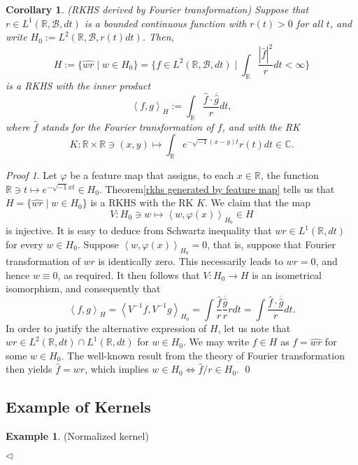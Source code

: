 \documentclass[a4paper,12pt]{article}
\newtheorem{cor}[thm]{Corollary}
\theoremstyle{remark}
\newtheorem*{prf}{Proof}
\theoremstyle{definition}
\theoremstyle{definition}
\newtheorem{ex}[thm]{Example}
\theoremstyle{definition}
\newcommand{\ip}[2]{\left<#1, #2 \right>}
\newcommand{\fin}{\hfill \( \triangleleft \) }
\begin{document}
\begin{cor}(RKHS derived by Fourier transformation)
	Suppose that \( r \in L^1(\mathbb{R}, \mathscr{B}, dt) \) is a bounded continuous function with \( r(t) >0 \) for all \( t \), and write
	\( H_0 := L^2(\mathbb{R}, \mathscr{B}, r(t)dt) \).
	Then,
	\[
		H:= \{ \hat{wr} \mid w \in H_0\}
		= \{ f \in L^2(\mathbb{R}, \mathscr{B}, dt) \mid \int_{\mathbb{R}} \frac{|\hat{f}|^2}{r}   dt < \infty \}
	\]
	is a RKHS with the inner product
	\[
		\ip{f}{g}_H := \int_{\mathbb{R}} \frac{\hat{f} \cdot \overline{\hat{g}}}{r} dt,
	\]
	where \( \hat{f} \) stands for the Fourier transformation of \( f \), and with the RK
	\[
		K: \mathbb{R} \times \mathbb{R} \ni (x,y) \mapsto \int_{\mathbb{R}} e^{-\sqrt{-1}(x-y)t} r(t) dt \in \mathbb{C}.
	\]
\end{cor}
\begin{prf}
	Let \( \varphi \) be a feature map that assigns, to each \( x \in \mathbb{R} \), the function \( \mathbb{R} \ni t \mapsto e^{- \sqrt{-1}xt} \in H_0 \). Theorem\ref{rkhs generated by feature map} tells us that \( H = \{\widehat{wr} \mid w \in H_0\} \) is a RKHS with the RK \( K \). We claim that the map
	\[
		V: H_0 \ni w \mapsto \ip{w}{\varphi(x)}_{H_0} \in H
	\]
	is injective. It is easy to deduce from Schwartz inequality that \( wr \in L^1(\mathbb{R}, dt) \) for every \( w \in H_0 \). Suppose \( \ip{w}{\varphi(x)}_{H_0} = 0 \), that is, suppose that Fourier transformation of \( wr \) is identically zero. This necessarily leads to \( wr = 0 \), and hence \(  w \equiv 0 \), as required.
	It then follows that \( V:H_0 \to H \) is an isometrical isomorphism, and consequently that
	\[
		\ip{f}{g}_H
		= \ip{V^{-1}f}{V^{-1}g}_{H_0}
		= \int \frac{\hat{f}}{r} \frac{\overline{\hat{g}}}{r} r dt
		= \int \frac{\hat{f} \cdot \overline{\hat{g}}}{r} dt.
	\]
	In order to justify the alternative expression of \( H \), let us note that \( wr \in L^2(\mathbb{R}, dt)\cap L^1(\mathbb{R}, dt) \) for \( w \in H_0 \).
	We may write \( f \in H \) as \( f = \widehat{wr} \) for some \( w \in H_0 \).
	The well-known result from the theory of Fourier transformation then yields \( \hat{f} = wr \), which implies \( w \in H_0 \iff \hat{f}/r \in H_0 \).
	\qed\end{prf}

\subsection{Example of Kernels}

\begin{ex} (Normalized kernel)

	\fin\end{ex}
\end{document}
